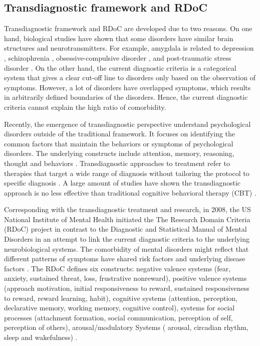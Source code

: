 \subsection{Transdiagnostic framework and RDoC}
Transdiagnostic framework and RDoC are developed due to two reasons. On one hand, biological studies have shown that some disorders have similar brain structures and neurotransmitters. For example, amygdala is related to depression \cite{bowley2002low}, schizophrenia \cite{kosaka2002differential,kubicki2002voxel}, obsessive-compulsive disorder \cite{szeszko1999orbital}, and post-traumatic stress disorder \cite{rauch2000exaggerated}. On the other hand, the current diagnostic criteria is a categorical system that gives a clear cut-off line to disorders only based on the observation of symptoms. However, a lot of disorders have overlapped symptoms, which results in arbitrarily defined boundaries of the disorders. Hence, the current diagnostic criteria cannot explain the high ratio of comorbidity.

Recently, the emergence of transdiagnostic perspective understand psychological disorders outside of the traditional framework. It focuses on identifying the common factors that maintain the behaviors or symptoms of psychological disorders. The underlying constructs include attention, memory, reasoning, thought and behaviors \cite{harvey2004cognitive}. Transdiagnostic approaches to treatment refer to therapies that target a wide range of diagnosis without tailoring the protocol to specific diagnosis \cite{mansell2008cognitive}. A large amount of studies have shown the transdiagnostic approach is no less effective than traditional cognitive behavioral therapy (CBT) \cite{norton2008transdiagnostic,craske2012transdiagnostic,sauer2012role}.

Corresponding with the transdiagnostic treatment and research, in 2008, the US National Institute of Mental Health initiated the The Research Domain Criteria (RDoC) project in contrast to the Diagnostic and Statistical Manual of Mental Disorders in an attempt to link the current diagnostic criteria to the underlying neurobiological systems. The comorbidity of mental disorders might reflect that different patterns of symptoms have shared risk factors and underlying disease factors \cite{insel2010research}. The RDoC defines six constructs: negative valence systems (fear, anxiety, sustained threat, loss, frustrative nonreward), positive valence systems (approach motivation, initial responsiveness to reward, sustained responsiveness to reward, reward learning, habit), cognitive systems (attention, perception, declarative memory, working memory, cognitive control), systems for social processes (attachment formation, social communication, perception of self, perception of others), arousal/modulatory Systems (
arousal, circadian rhythm, sleep and wakefulness) \cite{insel2010research}. 

